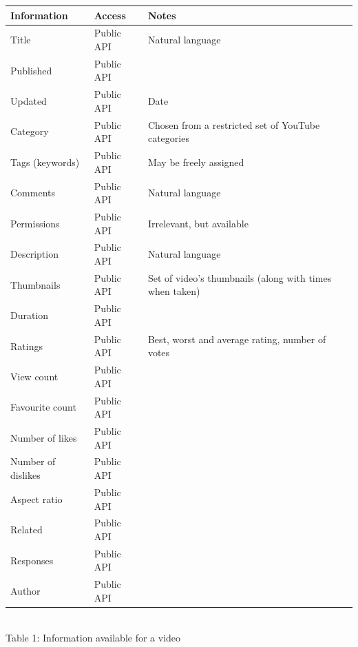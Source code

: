 \begin{center}
  \begin{tabular}{|p{3cm} | l | p{4cm}|} \hline
  Information & Access & Notes\\ \hline
  Title & Public API & Natural language \\
  Published & Public API & \\
  Updated & Public API & Date \\
  Category & Public API & Chosen from a restricted set of YouTube categories \\
  Tags (keywords) & Public API & May be freely assigned \\
  Comments & Public API & Natural language \\
  Permissions & Public API & Irrelevant, but available \\
  Description & Public API & Natural language \\
  Thumbnails & Public API & Set of video's thumbnails (along with times
  when taken) \\
  Duration & Public API & \\
  Ratings & Public API & Best, worst and average rating, number of votes \\
  View count & Public API & \\
  Favourite count & Public API & \\
  Number of likes & Public API & \\
  Number of dislikes & Public API & \\
  Aspect ratio & Public API & \\
  Related & Public API & \\
  Responses & Public API & \\
  Author & Public API & \\ \hline
  \end{tabular} \\
  Table 1: Information available for a video \\
\end{center}

